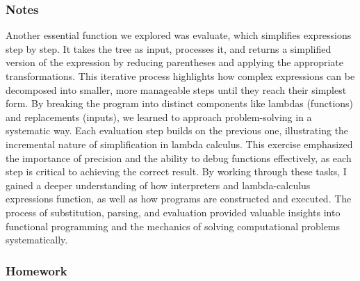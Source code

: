 \documentclass{article}
\theoremstyle{theorem}
\theoremstyle{definition}
\theoremstyle{remark}
\begin{document}
\subsubsection{Notes}

Another essential function we explored was evaluate, which simplifies 
expressions step by step. It takes the tree as input, processes it, and 
returns a simplified version of the expression by reducing parentheses and 
applying the appropriate transformations. This iterative process highlights 
how complex expressions can be decomposed into smaller, more manageable steps 
until they reach their simplest form. By breaking the program into distinct 
components like lambdas (functions) and replacements (inputs), we learned to 
approach problem-solving in a systematic way. Each evaluation step builds on the 
previous one, illustrating the incremental nature of simplification in lambda 
calculus. This exercise emphasized the importance of precision and the ability to 
debug functions effectively, as each step is critical to achieving the correct result. 
By working through these tasks, I gained a deeper understanding of how interpreters 
and lambda-calculus expressions function, as well as how programs are constructed 
and executed. The process of substitution, parsing, and evaluation provided 
valuable insights into functional programming and the mechanics of solving 
computational problems systematically.

\subsubsection{Homework}
\end{document}
